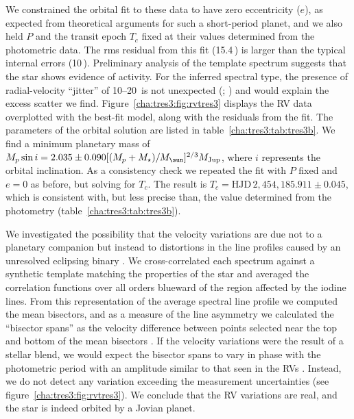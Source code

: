 We constrained the orbital fit to these data to have zero eccentricity ($e$), as expected from theoretical arguments for such a short-period planet, and we also held $P$ and the transit epoch $T_c$ fixed at their values determined from the photometric data. 
The rms residual from this fit (15.4\,\ms) is larger than the typical internal errors (10\,\ms).
Preliminary analysis of the template spectrum suggests that the star shows evidence of activity.
For the inferred spectral type, the presence of radial-velocity ``jitter'' of \mbox{10--20\,\ms} is not unexpected (\citealp*{Saar_Butler_Marcy:apjl:1998a}; \citealp{Santos_Mayor_Naef:aa:2000a, Wright:pasp:2005a}) and would explain the excess scatter we find.
Figure~\ref{cha:tres3:fig:rvtres3} displays the RV data overplotted with the best-fit model, along with the residuals from the fit.
The parameters of the orbital solution are listed in table~\ref{cha:tres3:tab:tres3b}.
We find a minimum planetary mass of \mbox{$M_p \sin i = 2.035 \pm 0.090 [(M_p+M_{\star})/M_{\sun}]^{2/3} M_{\rm Jup}$}, where $i$ represents the orbital inclination. 
As a consistency check we repeated the fit with $P$ fixed and $e = 0$ as before, but
solving for $T_c$.
The result is $T_c = \mathrm{HJD}\,2,\!454,\!185.911 \pm 0.045$, which is consistent with, but less precise than, the value determined from the photometry (table~\ref{cha:tres3:tab:tres3b}).

We investigated the possibility that the velocity variations are due not to a planetary companion but instead to distortions in the line profiles caused by an unresolved eclipsing binary \citep{Santos_Mayor_Naef:aa:2002a, Torres_Konacki_Sasselov:apj:2005a}. 
We cross-correlated each spectrum against a synthetic template matching the properties of the star and averaged the correlation functions over all orders blueward of the region affected by the iodine lines.
From this representation of the average spectral line profile we computed the mean bisectors, and as a measure of the line asymmetry we calculated the ``bisector spans'' as the velocity difference between points selected near the top and bottom of the mean bisectors \citep{Torres_Konacki_Sasselov:apj:2005a}.
If the velocity variations were the result of a stellar blend, we would expect the bisector spans to vary in phase with the photometric period with an amplitude similar to that seen in the RVs \citep{Queloz_Henry_Sivan:aa:2001a, Mandushev_Torres_Latham:apj:2005a}.
Instead, we do not detect any variation exceeding the measurement uncertainties (see figure~\ref{cha:tres3:fig:rvtres3}). 
We conclude that the RV variations are real, and the star is indeed orbited by a Jovian
planet.

